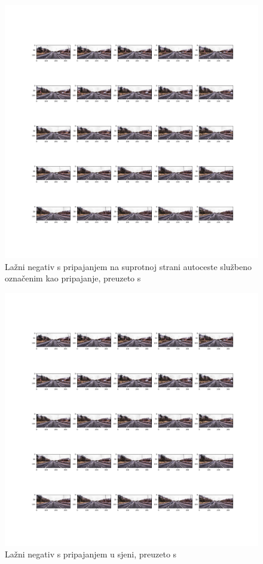 \documentclass[times, utf8, diplomski, numeric]{fer}
\begin{document}
\begin{figure}[H]
\centering
\includegraphics[scale=0.3]{images/fn_2.png}
\caption{Lažni negativ s pripajanjem na suprotnoj strani autoceste službeno označenim kao pripajanje, preuzeto s \citep{url:ftts_irap}}
\label{img:fn_2}
\end{figure}

\begin{figure}[H]
\centering
\includegraphics[scale=0.3]{images/fn_2.png}
\caption{Lažni negativ s pripajanjem u sjeni, preuzeto s \citep{url:ftts_irap}}
\label{img:fn_3}
\end{figure}
\end{document}
